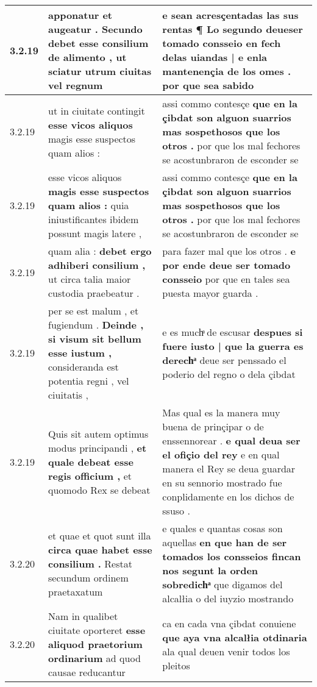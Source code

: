 \begin{tabular}{|p{1cm}|p{6.5cm}|p{6.5cm}|}
3.2.19 & apponatur et augeatur . \textbf{ Secundo debet esse consilium de alimento , } ut sciatur utrum ciuitas vel regnum & e sean acresçentadas las sus rentas ¶ \textbf{ Lo segundo deueser tomado consseio en fech delas uiandas | e enla mantenençia de los omes . } por que sea sabido \\\hline
3.2.19 & ut in ciuitate contingit \textbf{ esse vicos aliquos } magis esse suspectos quam alios : & assi commo contesçe \textbf{ que en la çibdat son alguon suarrios mas sospethosos que los otros . } por que los mal fechores se acostunbraron de esconder se \\\hline
3.2.19 & esse vicos aliquos \textbf{ magis esse suspectos quam alios : } quia iniustificantes ibidem possunt magis latere , & assi commo contesçe \textbf{ que en la çibdat son alguon suarrios mas sospethosos que los otros . } por que los mal fechores se acostunbraron de esconder se \\\hline
3.2.19 & quam alia : \textbf{ debet ergo adhiberi consilium , } ut circa talia maior custodia praebeatur . & para fazer mal que los otros . \textbf{ e por ende deue ser tomado consseio } por que en tales sea puesta mayor guarda . \\\hline
3.2.19 & per se est malum , et fugiendum . \textbf{ Deinde , si visum sit bellum esse iustum , } consideranda est potentia regni , vel ciuitatis , & e es muchͣ de escusar \textbf{ despues si fuere iusto | que la guerra es derechͣ } deue ser penssado el poderio del regno o dela çibdat \\\hline
3.2.19 & Quis sit autem optimus modus principandi , \textbf{ et quale debeat esse regis officium , } et quomodo Rex se debeat & Mas qual es la manera muy buena de prinçipar o de enssennorear . \textbf{ e qual deua ser el ofiçio del rey } e en qual manera el Rey se deua guardar en su sennorio mostrado fue conplidamente en los dichos de ssuso . \\\hline
3.2.20 & et quae et quot sunt illa \textbf{ circa quae habet esse consilium . } Restat secundum ordinem praetaxatum & e quales e quantas cosas son aquellas \textbf{ en que han de ser tomados los consseios fincan nos segunt la orden sobredichͣ } que digamos del alcalłia o del iuyzio mostrando \\\hline
3.2.20 & Nam in qualibet ciuitate oporteret \textbf{ esse aliquod praetorium ordinarium } ad quod causae reducantur & ca en cada vna çibdat conuiene \textbf{ que aya vna alcalłia otdinaria } ala qual deuen venir todos los pleitos \\\hline

\end{tabular}
